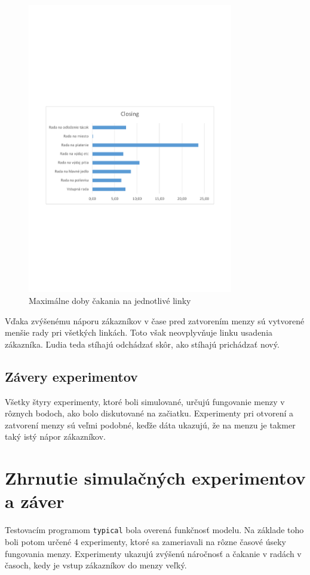 \documentclass{article}
\begin{document}
\begin{figure}[h!]
  \centering
  \includegraphics[width=0.8\textwidth,keepaspectratio]{experiment_4.pdf}
  \caption{Maximálne doby čakania na jednotlivé linky}
  \label{fig:experiment_4}
\end{figure}

Vďaka zvýšenému náporu zákazníkov v čase pred zatvorením menzy sú vytvorené menšie rady pri všetkých linkách. Toto však neovplyvňuje linku usadenia zákazníka. Ľudia teda stíhajú odchádzať skôr, ako stíhajú prichádzať nový.

\subsection{Závery experimentov}
Všetky štyry experimenty, ktoré boli simulované, určujú fungovanie menzy v rôznych bodoch, ako bolo diskutované na začiatku. Experimenty pri otvorení a zatvorení menzy sú veľmi podobné, keďže dáta ukazujú, že na menzu je takmer taký istý nápor zákazníkov.

\section{Zhrnutie simulačných experimentov a záver}
Testovacím programom \texttt{typical} bola overená funkčnosť modelu. Na základe toho boli potom určené 4 experimenty, ktoré sa zameriavali na rôzne časové úseky fungovania menzy. Experimenty ukazujú zvýšenú náročnosť a čakanie v radách v časoch, kedy je vstup zákazníkov do menzy veľký.
\end{document}
